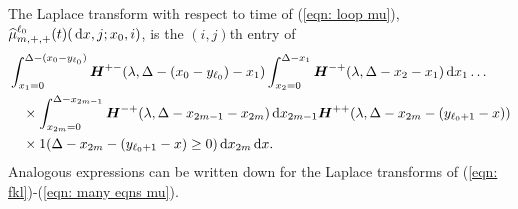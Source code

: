 The Laplace transform with respect to time of (\ref{eqn: loop mu}), \(\widehat \mu^{\ell_0}_{m,+,+}(t)(\, \mathrm{d} x,j;x_0,i)\), is the \((i,j)\)th entry of 
\begin{align}
	\nonumber&\int_{x_1 = 0}^{\Delta-(x_0-y_{\ell_0})} \boldsymbol H^{+-}(\lambda,\Delta-(x_0-y_{\ell_0})-x_1) \int_{x_2 = 0}^{\Delta-x_1} \boldsymbol H^{-+}(\lambda,\Delta - x_2-x_1) \, \mathrm{d} x_1 \dots  
	\\&\quad\times \int_{x_{2m}=0}^{\Delta-x_{2m-1}} \boldsymbol H^{-+}(\lambda,\Delta -x_{2m-1} - x_{2m}) \, \mathrm{d} x_{2m-1}\boldsymbol H^{++}(\lambda,\Delta -x_{2m}- (y_{\ell_0+1}- x)) \nonumber
	\\&\quad\times 1(\Delta-x_{2m}-(y_{\ell_0+1}-x)\geq 0)\, \mathrm{d} x_{2m}\, \mathrm{d} x. \label{eqn: lst herwe2}
\end{align} 
Analogous expressions can be written down for the Laplace transforms of (\ref{eqn: fkl})-(\ref{eqn: many eqns mu}).

